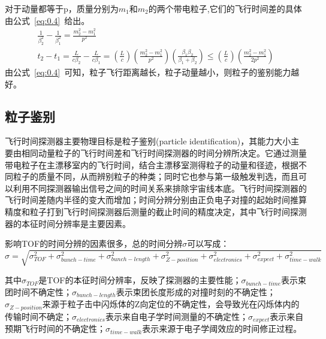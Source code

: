 
对于动量都等于p，质量分别为$m_{1}$和$m_{2}$的两个带电粒子,它们的飞行时间差的具体由公式~\ref{eq:0.4}~给出。
\begin{align}
\frac{1}{\beta^{2}_{2}}-\frac{1}{\beta^{2}_{1}}=\frac{m^{2}_{2}-m^{2}_{1}}{p^{2}}
\label{eq:0.3}\\
t_{2}-t_{1}=\frac{L}{c\beta_{2}}-\frac{L}{c\beta_{1}}=(\frac{L}{c})(\frac{m^{2}_{2}-m^{2}_{1}}{p^{2}})(\frac{\beta_{1}\beta_{2}}{\beta_{1}+\beta_{2}})\leq(\frac{L}{c})(\frac{m^{2}_{2}-m^{2}_{1}}{2p^{2}})
\label{eq:0.4}
\end{align}
由公式~\ref{eq:0.4}~可知，粒子飞行距离越长，粒子动量越小，则粒子的鉴别能力越好。

\subsection{粒子鉴别}
飞行时间探测器主要物理目标是粒子鉴别(particle identification)，其能力大小主要由相同动量粒子的飞行时间差和飞行时间探测器的时间分辨所决定。它通过测量带电粒子在主漂移室内的飞行时间，结合主漂移室测得粒子的动量和径迹，根据不同粒子的质量不同，从而辨别粒子的种类；同时它也参与第一级触发判选，而且可以利用不同探测器输出信号之间的时间关系来排除宇宙线本底。飞行时间探测器的飞行时间差随内半径的变大而增加；时间分辨分别由正负电子对撞的起始时间推算精度和粒子打到飞行时间探测器后测量的截止时间的精度决定，其中飞行时间探测器的本征时间分辨率是主要因素。

影响TOF的时间分辨的因素很多，总的时间分辨$\sigma$可以写成：
\begin{displaymath}
\sigma=\sqrt{\sigma_{TOF}^{2}+\sigma_{bunch-time}^{2}+\sigma_{bunch-length}^{2}+\sigma_{Z-position}^{2}+\sigma_{electronics}^{2}+\sigma_{expect}^{2}+\sigma_{time-walk}^{2}}
\end{displaymath}

其中$\sigma_{TOF}$是TOF的本征时间分辨率，反映了探测器的主要性能；$\sigma_{bunch-time}$表示束团时间不确定性；$\sigma_{bunch-length}$表示束团长度形成的对撞时刻的不确定性；$\sigma_{Z-position}$来源于粒子击中闪烁体的Z向定位的不确定性，会导致光在闪烁体内的传输时间不确定；$\sigma_{electronics}$表示来自电子学时间测量的不确定性；$\sigma_{expect}$表示来自预期飞行时间的不确定性；$\sigma_{time-walk}$表示来源于电子学阈效应的时间修正过程。

